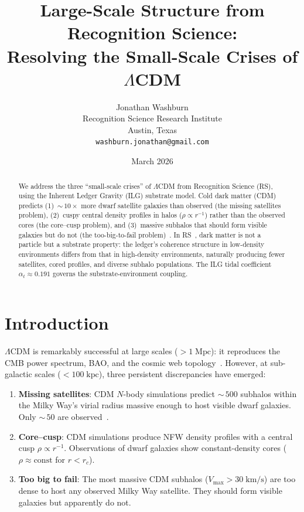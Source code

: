 \documentclass[12pt,a4paper]{article}
\title{Large-Scale Structure from Recognition Science:\\
Resolving the Small-Scale Crises of $\Lambda$CDM}
\author{Jonathan Washburn\\
Recognition Science Research Institute\\
Austin, Texas\\
\texttt{washburn.jonathan@gmail.com}}
\date{March 2026}
\theoremstyle{definition}
\theoremstyle{remark}
\begin{document}
\maketitle

\begin{abstract}
We address the three ``small-scale crises'' of $\Lambda$CDM from
Recognition Science (RS), using the Inherent Ledger Gravity (ILG)
substrate model.  Cold dark matter (CDM) predicts
(1)~${\sim}\,10\times$ more dwarf satellite galaxies than observed
(the missing satellites problem), (2)~cuspy central density profiles
in halos ($\rho \propto r^{-1}$) rather than the observed cores
(the core--cusp problem), and (3)~massive subhalos that should form
visible galaxies but do not (the too-big-to-fail
problem)~\cite{Bullock2017}.  In RS~\cite{RS_Axioms}, dark matter is not a particle but a substrate
property: the ledger's coherence structure in low-density environments
differs from that in high-density environments, naturally producing
fewer satellites, cored profiles, and diverse subhalo populations.  The ILG tidal coefficient
$\alpha_t \approx 0.191$ governs the substrate-environment
coupling.
\end{abstract}

\section{Introduction}
\label{sec:intro}

$\Lambda$CDM is remarkably successful at large scales
($> 1\;\mathrm{Mpc}$): it reproduces the CMB power spectrum, BAO,
and the cosmic web topology~\cite{Planck2020}.  However, at
sub-galactic scales ($< 100\;\mathrm{kpc}$), three persistent
discrepancies have emerged:

\begin{enumerate}
  \item \textbf{Missing satellites}: CDM $N$-body simulations
  predict ${\sim}\,500$ subhalos within the Milky Way's virial
  radius massive enough to host visible dwarf galaxies.
  Only ${\sim}\,50$ are observed~\cite{Bullock2017}.

  \item \textbf{Core--cusp}: CDM simulations produce NFW density
  profiles with a central cusp $\rho \propto r^{-1}$.  Observations
  of dwarf galaxies show constant-density cores
  ($\rho \approx \mathrm{const}$ for $r < r_c$).

  \item \textbf{Too big to fail}: The most massive CDM subhalos
  ($V_{\max} > 30\;\mathrm{km/s}$) are too dense to host any
  observed Milky Way satellite.  They should form visible galaxies
  but apparently do not.
\end{enumerate}
\end{document}
